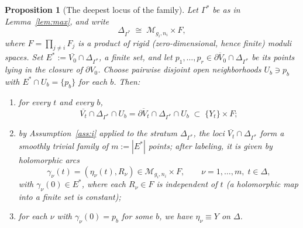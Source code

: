 \documentclass[11pt]{amsart}
\newtheorem{proposition}[theorem]{Proposition}
\theoremstyle{definition}
\theoremstyle{remark}
\newcommand{\M}{\mathcal{M}}
\begin{document}
\begin{proposition}[The deepest locus of the family]\label{prop:deepest}
Let $\Gamma^*$ be as in Lemma~\ref{lem:max}, and write
\[
\Delta_{\Gamma^*}\;\cong\;\M_{g_i,n_i}\times F,
\]
where $F=\prod_{j\neq i}F_j$ is a product of rigid (zero-dimensional, hence
finite) moduli spaces. Set $E^*:=\overline{V_0}\cap\Delta_{\Gamma^*}$, a
finite set, and let $p_1,\dots,p_r\in\overline{\partial V_0}\cap
\Delta_{\Gamma^*}$ be its points lying in the closure of $\partial V_0$.
Choose pairwise disjoint open neighborhoods $U_b\ni p_b$ with
$E^*\cap U_b=\{p_b\}$ for each $b$. Then:
\begin{enumerate}
\item[(a)] for every $t$ and every $b$,
\[
\overline{V_t}\cap\Delta_{\Gamma^*}\cap U_b
=\overline{\partial V_t}\cap\Delta_{\Gamma^*}\cap U_b
\;\subset\;\{Y_t\}\times F ;
\]
\item[(b)] by Assumption~\ref{ass:i} applied to the stratum
$\Delta_{\Gamma^*}$, the loci $\overline{V_t}\cap\Delta_{\Gamma^*}$ form a
smoothly trivial family of $m:=|E^*|$ points; after labeling, it is given by
holomorphic arcs
\[
\gamma_\nu(t)=(\eta_\nu(t),R_\nu)\in\M_{g_i,n_i}\times F,\qquad
\nu=1,\dots,m,\; t\in\Delta,
\]
with $\gamma_\nu(0)\in E^*$, where each $R_\nu\in F$ is independent of $t$
(a holomorphic map into a finite set is constant);
\item[(c)] for each $\nu$ with $\gamma_\nu(0)=p_b$ for some $b$, we have
$\eta_\nu\equiv Y$ on $\Delta$.
\end{enumerate}
\end{proposition}
\end{document}
